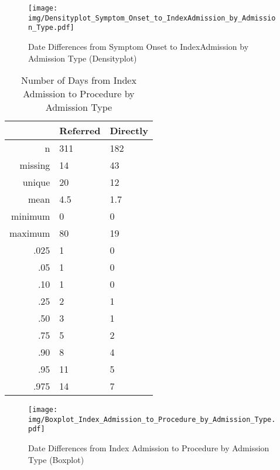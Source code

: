 \documentclass[presentation,xcolor=pdftex,dvipsnames,table,11pt]{beamer}
\begin{document}
\begin{tiny}
\begin{frame}
\begin{figure}
  \centering
  \caption{Date Differences from Symptom Onset to IndexAdmission by Admission Type (Densityplot)}
  \label{Density: Date Differences from Symptom Onset to IndexAdmission by Admission Type}
\texttt{[image: img/Densityplot\_Symptom\_Onset\_to\_IndexAdmission\_by\_Admission\_Type.pdf]}\end{figure}
\end{frame}




\begin{table}[ht]
\centering
\begin{tabular}{rll}
  \toprule
 & Referred & Directly \\ 
  \midrule
n & 311 & 182 \\ 
  missing & 14 & 43 \\ 
  unique & 20 & 12 \\ 
  mean & 4.5 & 1.7 \\ 
  minimum & 0 & 0 \\ 
  maximum & 80 & 19 \\ 
  .025 & 1 & 0 \\ 
  .05 & 1 & 0 \\ 
  .10 & 1 & 0 \\ 
  .25 & 2 & 1 \\ 
  .50 & 3 & 1 \\ 
  .75 & 5 & 2 \\ 
  .90 & 8 & 4 \\ 
  .95 & 11 & 5 \\ 
  .975 & 14 & 7 \\ 
   \bottomrule
\end{tabular}
\caption{Number of Days from Index Admission to Procedure by Admission Type} 
\end{table}
\begin{frame}
\begin{figure}
  \centering
  \caption{Date Differences from Index Admission to Procedure by Admission Type (Boxplot)}
  \label{Boxplot: Date Differences from Index Admission to Procedure by Admission Type}
\texttt{[image: img/Boxplot\_Index\_Admission\_to\_Procedure\_by\_Admission\_Type.pdf]}\end{figure}
\end{frame}



\end{tiny}
\end{document}
